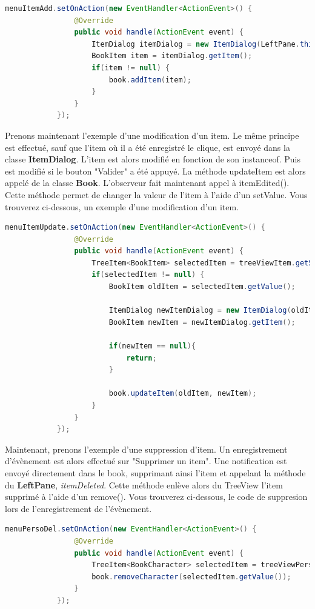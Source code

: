 			\begin{lstlisting}[gobble=12, language=java, caption=Ajout d'item]
			menuItemAdd.setOnAction(new EventHandler<ActionEvent>() {
				@Override
				public void handle(ActionEvent event) {
					ItemDialog itemDialog = new ItemDialog(LeftPane.this.book);
					BookItem item = itemDialog.getItem();
					if(item != null) {
						book.addItem(item);
					}
				}
			});
			\end{lstlisting}

			Prenons maintenant l'exemple d'une modification d'un item. Le même principe est effectué, sauf que l'item où il a été enregistré le clique, est envoyé dans la classe \textbf{ItemDialog}. L'item est alors modifié en fonction de son instanceof. Puis est modifié si le bouton "Valider" a été appuyé. La méthode updateItem est alors appelé de la classe \textbf{Book}. L'observeur fait maintenant appel à itemEdited(). Cette méthode permet de changer la valeur de l'item à l'aide d'un setValue. Vous trouverez ci-dessous, un exemple d'une modification d'un item.

			\begin{lstlisting}[gobble=12, language=java, caption=Modification d'item]
			menuItemUpdate.setOnAction(new EventHandler<ActionEvent>() {
				@Override
				public void handle(ActionEvent event) {
					TreeItem<BookItem> selectedItem = treeViewItem.getSelectionModel().getSelectedItem();
					if(selectedItem != null) {
						BookItem oldItem = selectedItem.getValue();

						ItemDialog newItemDialog = new ItemDialog(oldItem, LeftPane.this.book);
						BookItem newItem = newItemDialog.getItem();

						if(newItem == null){
							return;
						}

						book.updateItem(oldItem, newItem);
					}
				}
			});
			\end{lstlisting}

			Maintenant, prenons l'exemple d'une suppression d'item. Un enregistrement d'évènement est alors effectué sur "Supprimer un item". Une notification est envoyé directement dans le book, supprimant ainsi l'item et appelant la méthode du \textbf{LeftPane}, \textit{itemDeleted}. Cette méthode enlève alors du TreeView l'item supprimé à l'aide d'un remove(). Vous trouverez ci-dessous, le code de suppresion lors de l'enregistrement de l'évènement.

			\begin{lstlisting}[gobble=12, language=java, caption=Supression d'un item]
			menuPersoDel.setOnAction(new EventHandler<ActionEvent>() {
				@Override
				public void handle(ActionEvent event) {
					TreeItem<BookCharacter> selectedItem = treeViewPerso.getSelectionModel().getSelectedItem();
					book.removeCharacter(selectedItem.getValue());
				}
			});
			\end{lstlisting}


